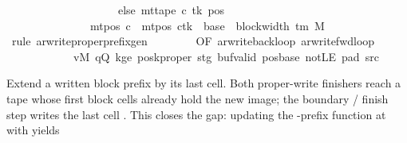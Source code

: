 \begin{isabellebody}
\ \ \ \ \ \ \ \ \ \ \ \ \ \ \ \ \ \ \ \ else\ mt{\isacharunderscore}{\kern0pt}tape\ c{\isacharprime}{\kern0pt}\ tk\ pos{\isacharparenright}{\kern0pt}{\isacharparenright}{\kern0pt}\isanewline
\ \ \ \ \ \ \ \ \ \ \ \ \ \ {\isasymand}\ mt{\isacharunderscore}{\kern0pt}pos\ c{}\ {\isacharequal}{\kern0pt}\ {\isacharparenleft}{\kern0pt}mt{\isacharunderscore}{\kern0pt}pos\ c{\isacharprime}{\kern0pt}{\isacharparenright}{\kern0pt}{\isacharparenleft}{\kern0pt}tk\ {\isacharcolon}{\kern0pt}{\isacharequal}{\kern0pt}\ base\ {\isacharplus}{\kern0pt}\ {\isacharparenleft}{\kern0pt}block{\isacharunderscore}{\kern0pt}width\ {\isacharparenleft}{\kern0pt}{\isasymGamma}{\isacharunderscore}{\kern0pt}tm\ M{\isacharparenright}{\kern0pt}\ {\isacharminus}{\kern0pt}\ {}{\isacharparenright}{\kern0pt}{\isacharparenright}{\kern0pt}{\isachardoublequoteclose}\isanewline
%
\isadelimproof
\ \ %
\endisadelimproof
%
\isatagproof
{}\isamarkupfalse%
\ {\isacharparenleft}{\kern0pt}rule\ ar{\isacharunderscore}{\kern0pt}write{\isacharunderscore}{\kern0pt}proper{\isacharunderscore}{\kern0pt}prefix{\isacharunderscore}{\kern0pt}gen\isanewline
\ \ \ \ \ \ \ \ {\isacharbrackleft}{\kern0pt}OF\ ar{\isacharunderscore}{\kern0pt}write{\isacharunderscore}{\kern0pt}back{\isacharunderscore}{\kern0pt}loop\ ar{\isacharunderscore}{\kern0pt}write{\isacharunderscore}{\kern0pt}fwd{\isacharunderscore}{\kern0pt}loop\isanewline
\ \ \ \ \ \ \ \ \ \ \ \ vM\ qQ\ kge{}\ poskproper\ stg\ buf{\isacharunderscore}{\kern0pt}valid\ pos{\isacharunderscore}{\kern0pt}base\ notLE\ pad{}\ src{}{\isacharbrackright}{\kern0pt}{\isacharparenright}{\kern0pt}%
\endisatagproof
{\isafoldproof}%
%
\isadelimproof
%
\endisadelimproof
%
\begin{isamarkuptext}%
Extend a written block prefix by its last cell.  Both
  proper-write finishers reach a tape whose first  block
  cells already hold the new  image; the boundary /
  finish step writes the last cell .  This
   closes the gap: updating the -prefix
  function at  with  yields

\end{isamarkuptext}
\end{isabellebody}
